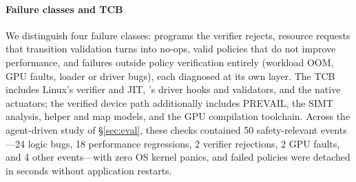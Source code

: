 \paragraph{Failure classes and TCB}
We distinguish four failure classes: programs the verifier rejects, resource requests that transition validation turns into no-ops, valid policies that do not improve performance, and failures outside policy verification entirely (workload OOM, GPU faults, loader or driver bugs), each diagnosed at its own layer.
The TCB includes Linux's verifier and JIT, \sys{}'s driver hooks and validators, and the native actuators; the verified device path additionally includes PREVAIL, the SIMT analysis, helper and map models, and the GPU compilation toolchain.
Across the agent-driven study of \S\ref{sec:eval}, these checks contained 50 safety-relevant events---24 logic bugs, 18 performance regressions, 2 verifier rejections, 2 GPU faults, and 4 other events---with zero OS kernel panics, and failed policies were detached in seconds without application restarts.
